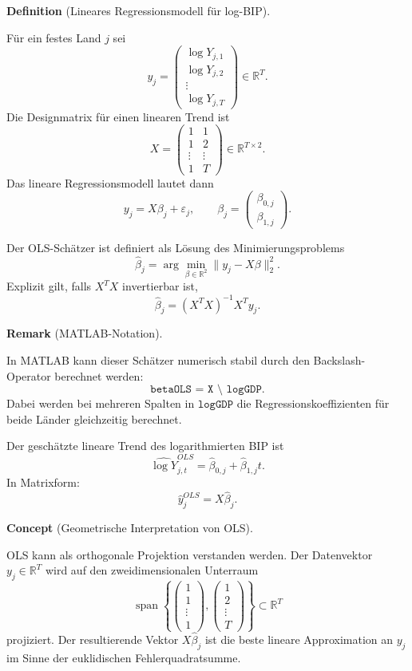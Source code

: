 \documentclass[10pt, letterpaper]{article}
\newcommand{\R}{\mathbb{R}}
\newcommand{\CustomHeading}[3]{%
  \par\medskip\noindent%
  \textbf{#1 #2} \textnormal{(#3)}.\enskip%
}
\newenvironment{DEF}[2]{\CustomHeading{Definition}{#1}{#2}}{}
\newenvironment{REM}[2]{\CustomHeading{Remark}{#1}{#2}}{}
\newenvironment{CONC}[2]{\CustomHeading{Concept}{#1}{#2}}{}
\begin{document}
\begin{DEF}{}{Lineares Regressionsmodell für log-BIP}
Für ein festes Land \(j\) sei
\[
y_j
=
\begin{pmatrix}
\log Y_{j,1}\\
\log Y_{j,2}\\
\vdots\\
\log Y_{j,T}
\end{pmatrix}
\in \R^T.
\]
Die Designmatrix für einen linearen Trend ist
\[
X
=
\begin{pmatrix}
1 & 1\\
1 & 2\\
\vdots & \vdots\\
1 & T
\end{pmatrix}
\in \R^{T\times 2}.
\]
Das lineare Regressionsmodell lautet dann
\[
y_j=X\beta_j+\varepsilon_j,
\qquad
\beta_j=
\begin{pmatrix}
\beta_{0,j}\\
\beta_{1,j}
\end{pmatrix}.
\]
\end{DEF}

Der OLS-Schätzer ist definiert als Lösung des Minimierungsproblems
\[
\widehat{\beta}_j
=
\arg\min_{\beta\in\R^2}
\|y_j-X\beta\|_2^2.
\]
Explizit gilt, falls \(X^TX\) invertierbar ist,
\[
\widehat{\beta}_j
=
(X^TX)^{-1}X^Ty_j.
\]

\begin{REM}{}{MATLAB-Notation}
In MATLAB kann dieser Schätzer numerisch stabil durch den Backslash-Operator berechnet werden:
\[
\texttt{betaOLS = X \textbackslash\ logGDP}.
\]
Dabei werden bei mehreren Spalten in \(\texttt{logGDP}\) die Regressionskoeffizienten für beide Länder gleichzeitig berechnet.
\end{REM}

Der geschätzte lineare Trend des logarithmierten BIP ist
\[
\widehat{\log Y}_{j,t}^{OLS}
=
\widehat{\beta}_{0,j}
+
\widehat{\beta}_{1,j}t.
\]
In Matrixform:
\[
\widehat{y}_j^{OLS}
=
X\widehat{\beta}_j.
\]

\begin{CONC}{}{Geometrische Interpretation von OLS}
OLS kann als orthogonale Projektion verstanden werden. Der Datenvektor \(y_j\in\R^T\) wird auf den zweidimensionalen Unterraum
\[
\operatorname{span}
\left\{
\begin{pmatrix}
1\\
1\\
\vdots\\
1
\end{pmatrix},
\begin{pmatrix}
1\\
2\\
\vdots\\
T
\end{pmatrix}
\right\}
\subset \R^T
\]
projiziert. Der resultierende Vektor \(X\widehat{\beta}_j\) ist die beste lineare Approximation an \(y_j\) im Sinne der euklidischen Fehlerquadratsumme.
\end{CONC}
\end{document}
